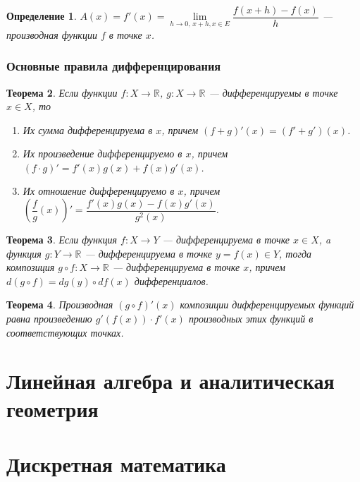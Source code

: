 \documentclass[12pt]{report}
\theoremstyle{plain}
\newtheorem{theorem}{Теорема}[chapter]
\newtheorem{definition}[theorem]{Определение}
\newcommand{\R}{\mathbb R}
\begin{document}
\begin{definition}
$A(x) = f'(x) = \lim\limits_{h\rightarrow 0,\, x+h, x\in E} \dfrac{f(x + h) - f(x)}{h}$ --- производная
функции $f$ в точке $x$.
\end{definition}

\subsection{Основные правила дифференцирования}
\begin{theorem}
Если функции $f: X \rightarrow \R$, $g: X \rightarrow \R$ --- дифференцируемы
в точке $x \in X$, то
\begin{enumerate}
  \item Их сумма дифференцируема в $x$, причем $(f + g)'(x) = (f' + g')(x)$.
  \item Их произведение дифференцируемо в $x$, причем $(f \cdot g)' = f'(x) g(x) + f(x) g'(x)$.
  \item Их отношение дифференцируемо в $x$, причем $\left(\dfrac{f}{g}(x)\right)' = \dfrac{f'(x) g(x) - f(x) g'(x)}{g^2(x)}$.
\end{enumerate}
\end{theorem}

\begin{theorem}
Если функция $f: X \rightarrow Y$ --- дифференцируема в точке $x \in X$,
a функция $g: Y \rightarrow \R$ --- дифференцируема в точке $y = f(x) \in Y$,
тогда композиция $g \circ f: X \rightarrow \R$ --- дифференцируема в точке $x$,
причем $d (g \circ f) = dg(y) \circ df(x)$ дифференциалов.
\end{theorem}

\begin{theorem}
Производная $(g \circ f)'(x)$ композиции дифференцируемых функций равна
произведению $g'(f(x)) \cdot f'(x)$ производных этих функций в соответствующих точках.
\end{theorem}


\chapter{Линейная алгебра и аналитическая геометрия}

\chapter{Дискретная математика}
\end{document}
